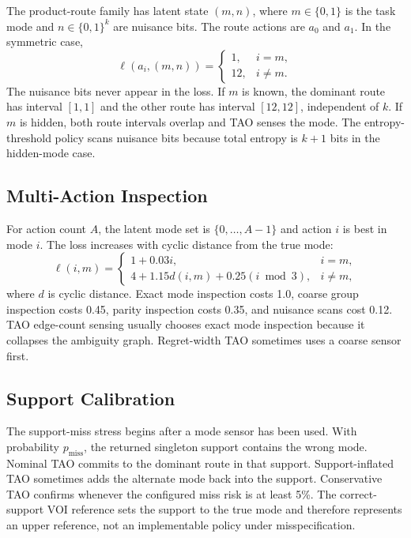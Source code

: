 \documentclass{article}
\newcommand{\loss}{\ell}
\begin{document}
The product-route family has latent state $(m,n)$, where $m\in\{0,1\}$ is the task mode and $n\in\{0,1\}^k$ are nuisance bits. The route actions are $a_0$ and $a_1$. In the symmetric case,
\begin{equation}
  \loss(a_i,(m,n)) =
  \begin{cases}
  1, & i=m,\\
  12, & i\neq m.
  \end{cases}
\end{equation}
The nuisance bits never appear in the loss. If $m$ is known, the dominant route has interval $[1,1]$ and the other route has interval $[12,12]$, independent of $k$. If $m$ is hidden, both route intervals overlap and TAO senses the mode. The entropy-threshold policy scans nuisance bits because total entropy is $k+1$ bits in the hidden-mode case.

\subsection{Multi-Action Inspection}

For action count $A$, the latent mode set is $\{0,\ldots,A-1\}$ and action $i$ is best in mode $i$. The loss increases with cyclic distance from the true mode:
\begin{equation}
  \loss(i,m) =
  \begin{cases}
  1 + 0.03i, & i=m,\\
  4 + 1.15d(i,m) + 0.25(i\bmod 3), & i\neq m,
  \end{cases}
\end{equation}
where $d$ is cyclic distance. Exact mode inspection costs 1.0, coarse group inspection costs 0.45, parity inspection costs 0.35, and nuisance scans cost 0.12. TAO edge-count sensing usually chooses exact mode inspection because it collapses the ambiguity graph. Regret-width TAO sometimes uses a coarse sensor first.

\subsection{Support Calibration}

The support-miss stress begins after a mode sensor has been used. With probability $p_{\mathrm{miss}}$, the returned singleton support contains the wrong mode. Nominal TAO commits to the dominant route in that support. Support-inflated TAO sometimes adds the alternate mode back into the support. Conservative TAO confirms whenever the configured miss risk is at least 5\%. The correct-support VOI reference sets the support to the true mode and therefore represents an upper reference, not an implementable policy under misspecification.
\end{document}
